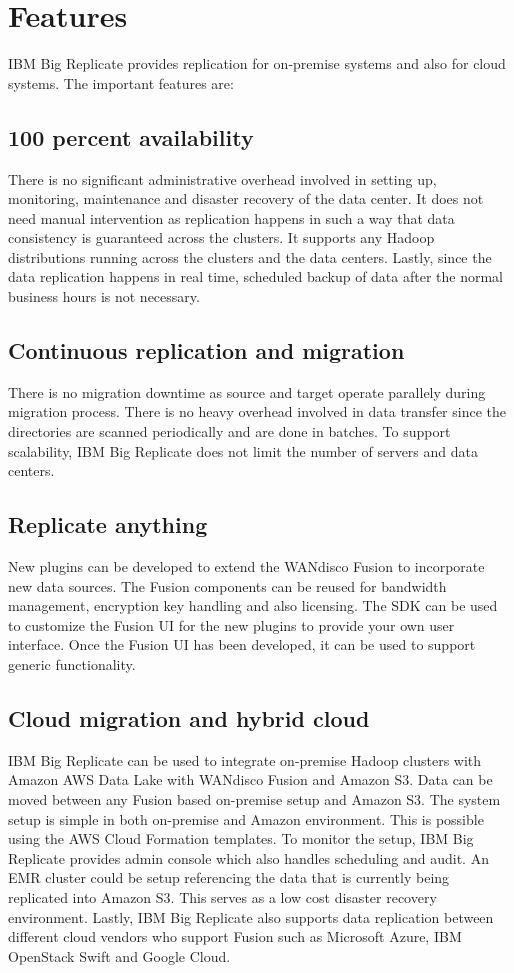 \section{Features}

IBM Big Replicate provides replication for on-premise systems and also for 
cloud systems. The important features are:

\subsection{100 percent availability}
There is no significant administrative overhead involved in setting up,
monitoring, maintenance and disaster recovery of the data center. It does not
need manual intervention as replication happens in such a way that data
consistency is guaranteed across the clusters. It supports any Hadoop
distributions running across the clusters and the data centers. Lastly, since
the data replication happens in real time, scheduled backup of data after the 
normal business hours is not necessary.

\subsection{Continuous replication and migration}
There is no migration downtime as source and target operate parallely during 
migration process. There is no heavy overhead involved in data transfer since
the directories are scanned periodically and are done in batches. To support 
scalability, IBM Big Replicate does not limit the number of servers and data
centers.

\subsection{Replicate anything}
New plugins can be developed to extend the WANdisco Fusion to incorporate new
data sources. The Fusion components can be reused for bandwidth management,
encryption key handling and also licensing. The SDK can be used to customize
the Fusion UI for the new plugins to provide your own user interface. Once the 
Fusion UI has been developed, it can be used to support generic functionality.

\subsection{Cloud migration and hybrid cloud}
IBM Big Replicate can be used to integrate on-premise Hadoop clusters with 
Amazon AWS Data Lake with WANdisco Fusion and Amazon S3. Data can be moved
between any Fusion based on-premise setup and Amazon S3. The system setup is
simple in both on-premise and Amazon environment. This is possible using the 
AWS Cloud Formation templates. To monitor the setup, IBM Big Replicate provides
admin console which also handles scheduling and audit. An EMR cluster could be
setup referencing the data that is currently being replicated into Amazon S3.
This serves as a low cost disaster recovery environment. Lastly, IBM Big 
Replicate also supports data replication between different cloud vendors who
support Fusion such as Microsoft Azure, IBM OpenStack Swift and Google Cloud.

